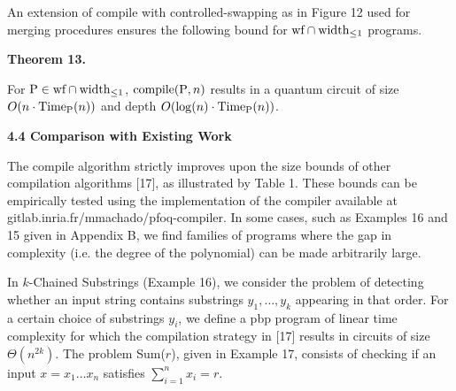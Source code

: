 \documentclass[10pt,a4paper]{amsart}
\begin{document}
 
An extension of compile with controlled-swapping as in Figure 12 used for merging procedures ensures the following bound for $\textnormal{{wf}}\cap\textnormal{{width}}_{\leq 1}$ programs.\par
 
 
 
\par\medskip\noindent\textbf{Theorem 13.}\par
 
 
For $\mathrm{P}\in\textnormal{{wf}}\cap\textnormal{{width}}_{\leq 1}$, $\textnormal{{{compile}}{}}(\mathrm{P},n)$ results in a quantum circuit of size $O(n\cdot\textnormal{Time}_{\mathrm{P}}(n))$ and depth ${O}(\log(n)\cdot\textnormal{Time}_{\mathrm{P}}(n))$.\par
 
 
 
 
 
\par\medskip\noindent\textbf{4.4 Comparison with Existing Work}\par
 
 
The compile algorithm strictly improves upon the size bounds of other compilation algorithms [17], as illustrated by Table 1. These bounds can be empirically tested using the implementation of the compiler available at gitlab.inria.fr/mmachado/pfoq-compiler. In some cases, such as Examples 16 and 15 given in Appendix B, we find families of programs where the gap in complexity (i.e. the degree of the polynomial) can be made arbitrarily large.\par
 
 
 
In $k$-Chained Substrings (Example 16), we consider the problem of detecting whether an input string contains substrings $y_{1},\dots,y_{k}$ appearing in that order. For a certain choice of substrings $y_{i}$, we define a pbp program of linear time complexity for which the compilation strategy in [17] results in circuits of size $\Theta(n^{2k})$. The problem Sum($r$), given in Example 17, consists of checking if an input $x=x_{1}\dots x_{n}$ satisfies $\sum_{i=1}^{n}x_{i}=r$.\par
 
\end{document}
